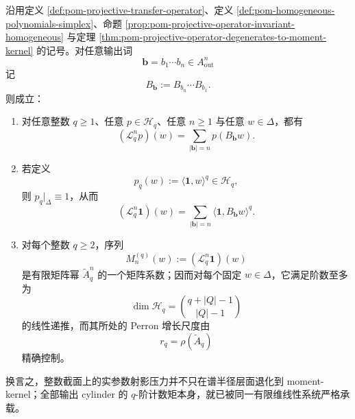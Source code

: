\begin{theorem}\label{thm:xi-projective-cylinder-qmoment-finite-realization}
沿用定义 \ref{def:pom-projective-transfer-operator}、定义 \ref{def:pom-homogeneous-polynomials-simplex}、命题 \ref{prop:pom-projective-operator-invariant-homogeneous} 与定理 \ref{thm:pom-projective-operator-degenerates-to-moment-kernel} 的记号。对任意输出词
\[
\mathbf b=b_1\cdots b_n\in A_{\mathrm{out}}^n
\]
记
\[
B_{\mathbf b}:=B_{b_n}\cdots B_{b_1}.
\]
则成立：
\begin{enumerate}
  \item 对任意整数 \(q\ge 1\)、任意 \(p\in\mathcal H_q\)、任意 \(n\ge 1\) 与任意 \(w\in\Delta\)，都有
  \[
  \boxed{\;
  (\mathcal L_q^n p)(w)=\sum_{|\mathbf b|=n}p(B_{\mathbf b}w).\;}
  \]
  \item 若定义
  \[
  p_q(w):=\langle \mathbf 1,w\rangle^q\in\mathcal H_q,
  \]
  则 \(p_q|_{\Delta}\equiv 1\)，从而
  \[
  \boxed{\;
  (\mathcal L_q^n\mathbf 1)(w)
  =
  \sum_{|\mathbf b|=n}\langle \mathbf 1,B_{\mathbf b}w\rangle^q.\;}
  \]
  \item 对每个整数 \(q\ge 2\)，序列
  \[
  M_n^{(q)}(w):=(\mathcal L_q^n\mathbf 1)(w)
  \]
  是有限矩阵幂 \(\widetilde A_q^n\) 的一个矩阵系数；因而对每个固定 \(w\in\Delta\)，它满足阶数至多为
  \[
  \dim\mathcal H_q=\binom{q+|Q|-1}{|Q|-1}
  \]
  的线性递推，而其所处的 Perron 增长尺度由
  \[
  r_q=\rho(\widetilde A_q)
  \]
  精确控制。
\end{enumerate}
换言之，整数截面上的实参数射影压力并不只在谱半径层面退化到 moment-kernel；全部输出 cylinder 的 \(q\)-阶计数矩本身，就已被同一有限维线性系统严格承载。
\end{theorem}

